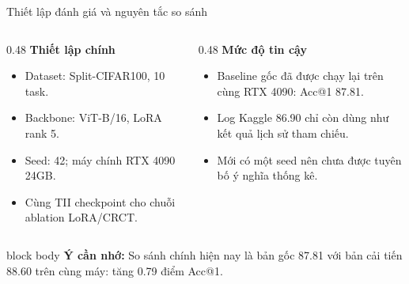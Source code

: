 \documentclass[aspectratio=169,11pt]{beamer}
\newcommand{\remember}[1]{%
  \vfill
  \begin{beamercolorbox}[wd=\textwidth,sep=0.22cm,rounded=true]{block body}
    \textbf{Ý cần nhớ:} #1
  \end{beamercolorbox}
}
\begin{document}
\begin{frame}{Thiết lập đánh giá và nguyên tắc so sánh}
  \begin{columns}[T,onlytextwidth]
    \begin{column}{0.48\textwidth}
      {\large\bfseries Thiết lập chính}\par\vspace{0.2cm}
      \begin{itemize}\setlength\itemsep{0.22cm}
        \item Dataset: Split-CIFAR100, 10 task.
        \item Backbone: ViT-B/16, LoRA rank 5.
        \item Seed: 42; máy chính RTX 4090 24GB.
        \item Cùng TII checkpoint cho chuỗi ablation LoRA/CRCT.
      \end{itemize}
    \end{column}
    \begin{column}{0.48\textwidth}
      {\large\bfseries Mức độ tin cậy}\par\vspace{0.2cm}
      \begin{itemize}\setlength\itemsep{0.22cm}
        \item Baseline gốc đã được chạy lại trên cùng RTX 4090: Acc@1 87.81.
        \item Log Kaggle 86.90 chỉ còn dùng như kết quả lịch sử tham chiếu.
        \item Mới có một seed nên chưa được tuyên bố ý nghĩa thống kê.
      \end{itemize}
    \end{column}
  \end{columns}
  \remember{So sánh chính hiện nay là bản gốc 87.81 với bản cải tiến 88.60 trên cùng máy: tăng 0.79 điểm Acc@1.}
\end{frame}
\end{document}
